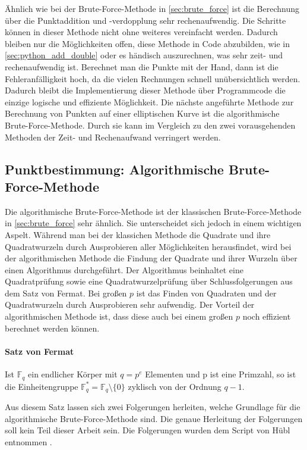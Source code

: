 Ähnlich wie bei der Brute-Force-Methode in \ref{sec:brute_force} ist die Berechnung über die Punktaddition und -verdopplung sehr rechenaufwendig. Die Schritte können in dieser Methode nicht ohne weiteres vereinfacht werden. Dadurch bleiben nur die Möglichkeiten offen, diese Methode in Code abzubilden, wie in \ref{sec:python_add_double} oder es händisch auszurechnen, was sehr zeit- und rechenaufwendig ist. Berechnet man die Punkte mit der Hand, dann ist die Fehleranfälligkeit hoch, da die vielen Rechnungen schnell unübersichtlich werden. Dadurch bleibt die Implementierung dieser Methode über Programmcode die einzige logische und effiziente Möglichkeit. Die nächste angeführte Methode zur Berechnung von Punkten auf einer elliptischen Kurve ist die algorithmische Brute-Force-Methode. Durch sie kann im Vergleich zu den zwei vorausgehenden Methoden der Zeit- und Rechenaufwand verringert werden.

\subsection{Punktbestimmung: Algorithmische Brute-Force-Methode}
Die algorithmische Brute-Force-Methode ist der klassischen Brute-Force-Methode in \ref{sec:brute_force} sehr ähnlich. Sie unterscheidet sich jedoch in einem wichtigen Aspelt. Während man bei der klassichen Methode die Quadrate und ihre Quadratwurzeln durch Ausprobieren aller Möglichkeiten herausfindet, wird bei der algorithmischen Methode die Findung der Quadrate und ihrer Wurzeln über einen Algorithmus durchgeführt. Der Algorithmus beinhaltet eine Quadratprüfung sowie eine Quadratwurzelprüfung über Schlussfolgerungen aus dem Satz von Fermat. Bei großen $p$ ist das Finden von Quadraten und der Quadratwurzeln durch Ausprobieren sehr aufwendig. Der Vorteil der algorithmischen Methode ist, dass diese auch bei einem großen $p$ noch effizient berechnet werden können. 

\paragraph{Satz von Fermat}
Ist $\mathbb{F}_q$ ein endlicher Körper mit $q = p^e$ Elementen und p ist eine Primzahl, so ist die Einheitengruppe $\mathbb{F}_q^* = \mathbb{F}_q \setminus \{0\}$ zyklisch von der Ordnung $q - 1$.

Aus diesem Satz lassen sich zwei Folgerungen herleiten, welche Grundlage für die algorithmische Brute-Force-Methode sind. Die genaue Herleitung der Folgerungen soll kein Teil dieser Arbeit sein. Die Folgerungen wurden dem Script von Hübl entnommen \cite[S. 269]{Dr.ReinholdHubl.2022}.

